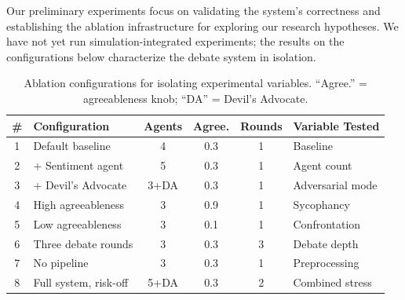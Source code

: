\documentclass{article}
\begin{document}
Our preliminary experiments focus on validating the system's correctness and establishing the ablation infrastructure for exploring our research hypotheses. We have not yet run simulation-integrated experiments; the results on the configurations below characterize the debate system in isolation.


\begin{table}[h]
\centering
\small
\begin{tabular}{@{}clcccl@{}}
\toprule
\textbf{\#} & \textbf{Configuration} & \textbf{Agents} & \textbf{Agree.} & \textbf{Rounds} & \textbf{Variable Tested} \\
\midrule
1 & Default baseline         & 4 & 0.3 & 1 & Baseline \\
2 & + Sentiment agent        & 5 & 0.3 & 1 & Agent count \\
3 & + Devil's Advocate       & 3+DA & 0.3 & 1 & Adversarial mode \\
4 & High agreeableness       & 3 & 0.9 & 1 & Sycophancy \\
5 & Low agreeableness        & 3 & 0.1 & 1 & Confrontation \\
6 & Three debate rounds      & 3 & 0.3 & 3 & Debate depth \\
7 & No pipeline              & 3 & 0.3 & 1 & Preprocessing \\
8 & Full system, risk-off    & 5+DA & 0.3 & 2 & Combined stress \\
\bottomrule
\end{tabular}
\vspace{4pt}
\setlength{\belowcaptionskip}{-4pt}
\caption{Ablation configurations for isolating experimental variables. ``Agree.'' = agreeableness knob; ``DA'' = Devil's Advocate.}
\label{tab:ablation-configs}
\end{table}
\end{document}
